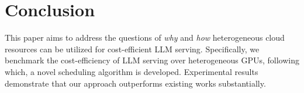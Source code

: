 \section{Conclusion}
\label{sec:conclusion}

This paper aims to address the questions of \textit{why} and \textit{how} heterogeneous cloud resources can be utilized for cost-efficient LLM serving. 
Specifically, we benchmark the cost-efficiency of LLM serving over heterogeneous GPUs, following which, a novel scheduling algorithm is developed. 
Experimental results demonstrate that our approach outperforms existing works substantially.
